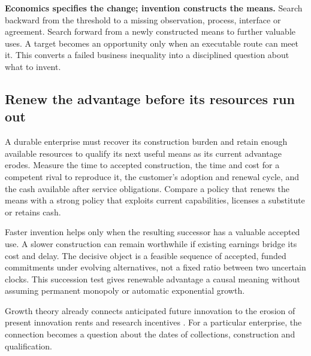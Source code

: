 \documentclass[11pt,letterpaper]{article}
\begin{document}
\textbf{Economics specifies the change; invention constructs the means.} Search backward from the threshold to a missing observation, process, interface or agreement. Search forward from a newly constructed means to further valuable uses. A target becomes an opportunity only when an executable route can meet it. This converts a failed business inequality into a disciplined question about what to invent.

\subsection{Renew the advantage before its resources run out}
A durable enterprise must recover its construction burden and retain enough available resources to qualify its next useful means as its current advantage erodes. Measure the time to accepted construction, the time and cost for a competent rival to reproduce it, the customer's adoption and renewal cycle, and the cash available after service obligations. Compare a policy that renews the means with a strong policy that exploits current capabilities, licenses a substitute or retains cash.

Faster invention helps only when the resulting successor has a valuable accepted use. A slower construction can remain worthwhile if existing earnings bridge its cost and delay. The decisive object is a feasible sequence of accepted, funded commitments under evolving alternatives, not a fixed ratio between two uncertain clocks. This succession test gives renewable advantage a causal meaning without assuming permanent monopoly or automatic exponential growth.

Growth theory already connects anticipated future innovation to the erosion of present innovation rents and research incentives \cite{aghionhowitt}. For a particular enterprise, the connection becomes a question about the dates of collections, construction and qualification.
\end{document}
